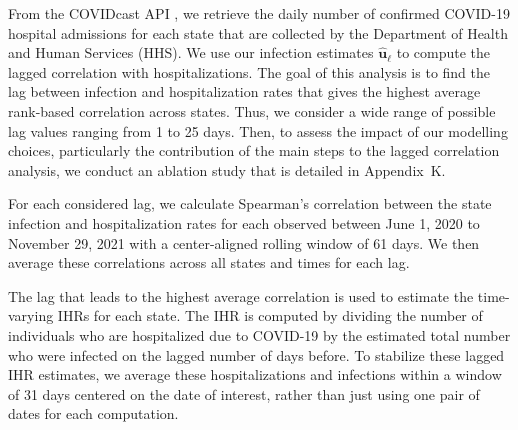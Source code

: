 From the COVIDcast API \citep{reinhart2021open}, we retrieve the daily number of
confirmed COVID-19 hospital admissions for each state that are collected by the
\US Department of Health and Human Services (HHS). We use our infection
estimates $\mathbf{\widehat{u}}_\ell$ to compute the lagged correlation with 
hospitalizations. The goal of this analysis is to find the lag between
infection and hospitalization rates that gives the highest average rank-based
correlation across \US states. Thus, we consider a wide range of possible
lag values ranging from 1 to 25 days. 
Then, to assess the impact of our modelling choices,
particularly the contribution of the main steps to the lagged
correlation analysis, we conduct an ablation study that is detailed
in Appendix~K.


For each considered lag, we calculate Spearman's correlation between the state
infection and hospitalization rates for each observed between June 1, 2020 to
November 29, 2021 with a center-aligned rolling window of 61 days. We then
average these correlations across all states and times for each lag. 

The lag that leads to the highest average correlation is used to estimate the
time-varying IHRs for each state. The IHR is computed by dividing the number of
individuals who are hospitalized due to COVID-19 by the estimated total number
who were infected on the lagged number of days before. To stabilize these lagged
IHR estimates, we average these hospitalizations and infections within a window
of 31 days centered on the date of interest, rather than just using one pair of
dates for each computation. 
